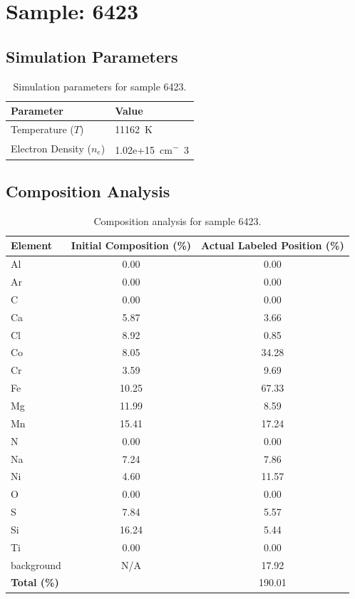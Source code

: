 \documentclass[a4paper,11pt]{article}
\begin{document}
\clearpage

\section{Sample: 6423}
\subsection{Simulation Parameters}
\begin{table}[h!]
    \centering
    \begin{tabular}{ll}
        \toprule
        \textbf{Parameter} & \textbf{Value} \\
        \midrule
        Temperature ($T$) & 11162 \,\si{K} \\
        Electron Density ($n_e$) & 1.02e+15 \,\si{cm^-3} \\
        \bottomrule
    \end{tabular}
    \caption{Simulation parameters for sample 6423.}
    \label{tab:params_6423}
\end{table}

\subsection{Composition Analysis}
\begin{table}[h!]
    \centering
    \begin{tabular}{lcc}
        \toprule
        \textbf{Element} & \textbf{Initial Composition (\%)} & \textbf{Actual Labeled Position (\%)} \\
        \midrule
        Al & 0.00 & 0.00 \\
        Ar & 0.00 & 0.00 \\
        C & 0.00 & 0.00 \\
        Ca & 5.87 & 3.66 \\
        Cl & 8.92 & 0.85 \\
        Co & 8.05 & 34.28 \\
        Cr & 3.59 & 9.69 \\
        Fe & 10.25 & 67.33 \\
        Mg & 11.99 & 8.59 \\
        Mn & 15.41 & 17.24 \\
        N & 0.00 & 0.00 \\
        Na & 7.24 & 7.86 \\
        Ni & 4.60 & 11.57 \\
        O & 0.00 & 0.00 \\
        S & 7.84 & 5.57 \\
        Si & 16.24 & 5.44 \\
        Ti & 0.00 & 0.00 \\
        background & N/A & 17.92 \\

        \midrule
        \textbf{Total (\%)} & & 190.01 \\
        \bottomrule
    \end{tabular}
    \caption{Composition analysis for sample 6423.}
    \label{tab:comp_6423}
\end{table}
\end{document}
